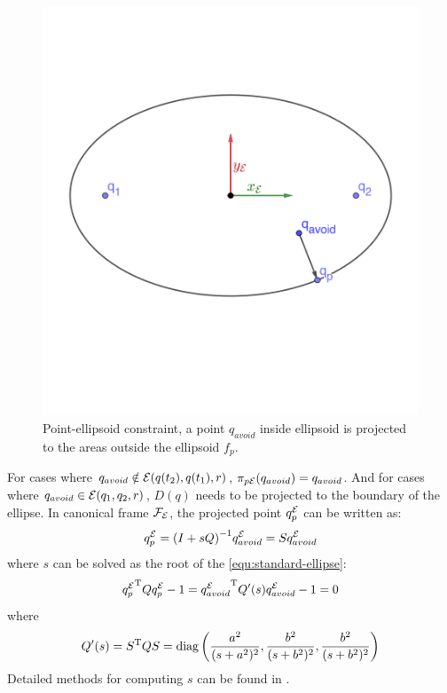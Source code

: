 \documentclass[journal]{IEEEtran}  %
\begin{document}
\begin{figure}[htbp]
\begin{center}
\includegraphics[width=0.6\linewidth, trim = 0.3cm 1.3cm 0.3cm 1.3cm, clip]{Ellipse2point}
\caption{Point-ellipsoid constraint, a point $q_{avoid}$ inside ellipsoid is projected to the areas outside the ellipsoid $f_{p}$.}
\label{fig:Ellipse-to-point}
\end{center}
\end{figure}

  For cases where $q_{avoid} \notin \mathcal{E}(q(t_2),q(t_1),r)$, $\pi_{p\mathcal{E}}(q_{avoid}) = q_{avoid}$. And for cases where $q_{avoid} \in \mathcal{E}(q_1,q_2,r)$, $D(q)$ needs to be projected to the boundary of the ellipse. In canonical frame $\mathcal{F}_{\mathcal{E}}$, the projected point $q^{\mathcal{E}}_{p}$ can be written as:
  \begin{equation}
  	q^{\mathcal{E}}_{p} = {(I+sQ)}^{-1} q^{\mathcal{E}}_{avoid} = S q^{\mathcal{E}}_{avoid}
  \end{equation}
  where $s$ can be solved as the root of the \eqref{equ:standard-ellipse}:
  \begin{equation}
    {q^{\mathcal{E}}_p}^\mathrm{T} Q q^{\mathcal{E}}_p-1={q^{\mathcal{E}}_{avoid}}^\mathrm{T} Q'(s) q^{\mathcal{E}}_{avoid} -1=0
  \end{equation}
  where
  \begin{equation}
    Q'(s) =S^\mathrm{T} Q S = \operatorname{diag}\left(\frac{a^{2}}{(s+a^{2})^2}, \frac{b^{2}}{(s+b^{2})^2},\frac{b^{2}}{(s+b^{2})^2}\right)
  \end{equation}
 Detailed methods for computing $s$ can be found in \cite{yang2021multi} \cite{yang2020multi} \cite{eberly}. 


\end{document}
